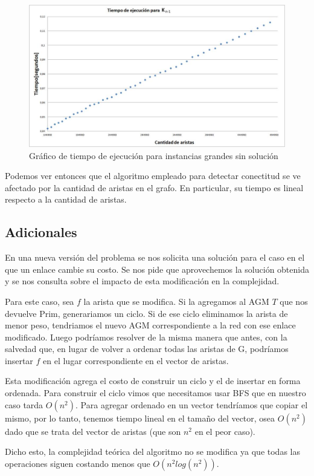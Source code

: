 \documentclass[11pt, a4paper, twoside]{article}
\begin{document}
\begin{figure}[H]
\centering
\includegraphics[scale=0.5]{imagenes/graph2.jpg}
\caption{Gráfico de tiempo de ejecución para instancias grandes sin solución}
\end{figure}


Podemos ver entonces que el algoritmo empleado para detectar conectitud se ve afectado por la cantidad de aristas en el grafo. En particular, su tiempo es lineal respecto a la cantidad de aristas.


\subsection{Adicionales}

En una nueva versión del problema se nos solicita una solución para el caso en el que un enlace cambie su costo. Se nos pide que aprovechemos la solución obtenida y se nos consulta sobre el impacto de esta modificación en la complejidad.

Para este caso, sea $f$ la arista que se modifica. Si la agregamos al AGM $T$ que nos devuelve Prim, generariamos un ciclo. Si de ese ciclo eliminamos la arista de menor peso, tendriamos el nuevo AGM correspondiente a la red con ese enlace modificado. Luego podríamos resolver de la misma manera que antes, con la salvedad que, en lugar de volver a ordenar todas las aristas de G, podríamos insertar $f$ en el lugar correspondiente en el vector de aristas. 

Esta modificación agrega el costo de construir un ciclo y el de insertar en forma ordenada. Para construir el ciclo vimos que necesitamos usar BFS que en nuestro caso tarda $O(n^2)$. Para agregar ordenado en un vector tendríamos que copiar el mismo, por lo tanto, tenemos tiempo lineal en el tamaño del vector, osea $O(n^2)$ dado que se trata del vector de aristas (que son $n^2$ en el peor caso). 

Dicho esto, la complejidad teórica del algoritmo no se modifica ya que todas las operaciones siguen costando menos que $O(n^2log(n^2))$.

\end{document}
